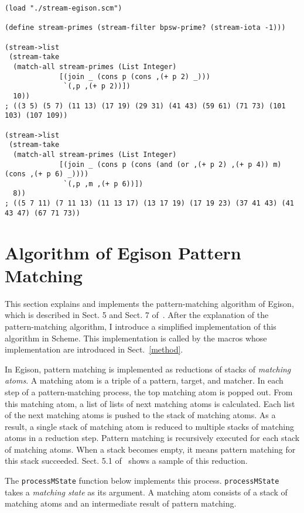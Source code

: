 \documentclass[acmlarge]{acmart}
\begin{document}
\begin{lstlisting}[language=egison]
(load "./stream-egison.scm")

(define stream-primes (stream-filter bpsw-prime? (stream-iota -1)))

(stream->list
 (stream-take
  (match-all stream-primes (List Integer)
             [(join _ (cons p (cons ,(+ p 2) _)))
              `(,p ,(+ p 2))])
  10))
; ((3 5) (5 7) (11 13) (17 19) (29 31) (41 43) (59 61) (71 73) (101 103) (107 109))

(stream->list
 (stream-take
  (match-all stream-primes (List Integer)
             [(join _ (cons p (cons (and (or ,(+ p 2) ,(+ p 4)) m) (cons ,(+ p 6) _))))
              `(,p ,m ,(+ p 6))])
  8))
; ((5 7 11) (7 11 13) (11 13 17) (13 17 19) (17 19 23) (37 41 43) (41 43 47) (67 71 73))
\end{lstlisting}


\section{Algorithm of Egison Pattern Matching}\label{algorithm}

This section explains and implements the pattern-matching algorithm of Egison, which is described in Sect. 5 and Sect. 7 of~\cite{egi2018aplas}.
After the explanation of the pattern-matching algorithm, I introduce a simplified implementation of this algorithm in Scheme.
This implementation is called by the macros whose implementation are introduced in Sect.~\ref{method}.

In Egison, pattern matching is implemented as reductions of stacks of \emph{matching atoms}.
A matching atom is a triple of a pattern, target, and matcher.
In each step of a pattern-matching process, the top matching atom is popped out.
From this matching atom, a list of lists of next matching atoms is calculated.
Each list of the next matching atoms is pushed to the stack of matching atoms.
As a result, a single stack of matching atom is reduced to multiple stacks of matching atoms in a reduction step.
Pattern matching is recursively executed for each stack of matching atoms.
When a stack becomes empty, it means pattern matching for this stack succeeded.
Sect. 5.1 of~\cite{egi2018aplas} shows a sample of this reduction.

\medskip

The \texttt{processMState} function below implements this process.
\texttt{processMState} takes a \emph{matching state} as its argument.
A matching atom consists of a stack of matching atoms and an intermediate result of pattern matching.
\end{document}
